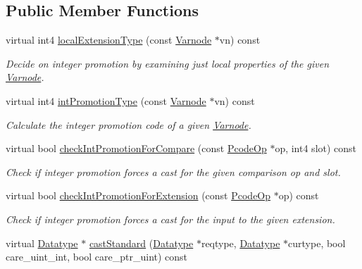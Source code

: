 \subsection*{Public Member Functions}
\begin{DoxyCompactItemize}
\item 
virtual int4 \mbox{\hyperlink{class_cast_strategy_c_ac630d23883fc4d95a12eba08b64e6734}{local\+Extension\+Type}} (const \mbox{\hyperlink{class_varnode}{Varnode}} $\ast$vn) const
\begin{DoxyCompactList}\small\item\em Decide on integer promotion by examining just local properties of the given \mbox{\hyperlink{class_varnode}{Varnode}}. \end{DoxyCompactList}\item 
virtual int4 \mbox{\hyperlink{class_cast_strategy_c_a628af1b296211f1cc9add47af576ea2b}{int\+Promotion\+Type}} (const \mbox{\hyperlink{class_varnode}{Varnode}} $\ast$vn) const
\begin{DoxyCompactList}\small\item\em Calculate the integer promotion code of a given \mbox{\hyperlink{class_varnode}{Varnode}}. \end{DoxyCompactList}\item 
virtual bool \mbox{\hyperlink{class_cast_strategy_c_a6d9b4790d67649bc3dcd760052de381a}{check\+Int\+Promotion\+For\+Compare}} (const \mbox{\hyperlink{class_pcode_op}{Pcode\+Op}} $\ast$op, int4 slot) const
\begin{DoxyCompactList}\small\item\em Check if integer promotion forces a cast for the given comparison op and slot. \end{DoxyCompactList}\item 
virtual bool \mbox{\hyperlink{class_cast_strategy_c_a567cf30b699d20f9652e0edb437a5994}{check\+Int\+Promotion\+For\+Extension}} (const \mbox{\hyperlink{class_pcode_op}{Pcode\+Op}} $\ast$op) const
\begin{DoxyCompactList}\small\item\em Check if integer promotion forces a cast for the input to the given extension. \end{DoxyCompactList}\item 
virtual \mbox{\hyperlink{class_datatype}{Datatype}} $\ast$ \mbox{\hyperlink{class_cast_strategy_c_a057c06b312662b80be294439465be4ff}{cast\+Standard}} (\mbox{\hyperlink{class_datatype}{Datatype}} $\ast$reqtype, \mbox{\hyperlink{class_datatype}{Datatype}} $\ast$curtype, bool care\+\_\+uint\+\_\+int, bool care\+\_\+ptr\+\_\+uint) const

\end{DoxyCompactItemize}

